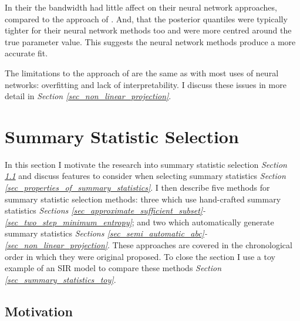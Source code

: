 \documentclass[11pt,a4paper]{article}
\theoremstyle{break}
\begin{document}
  \par In their the bandwidth had little affect on their neural network approaches, compared to the approach of \cite[]{ABC_in_population_genetics}. And, that the posterior quantiles were typically tighter for their neural network methods too and were more centred around the true parameter value. This suggests the neural network methods produce a more accurate fit.

  \par The limitations to the approach of \cite[]{non_linear_regression_models_for_abc} are the same as with most uses of neural networks: overfitting and lack of interpretability. I discuss these issues in more detail in \textit{Section \ref{sec_non_linear_projection}}.

\newpage
\section{Summary Statistic Selection}\label{sec_summary_stats}


  In this section I motivate the research into summary statistic selection \textit{Section \ref{sec_summary_stats_motivation}} and discuss features to consider when selecting summary statistics \textit{Section \ref{sec_properties_of_summary_statistics}}. I then describe five methods for summary statistic selection methods: three which use hand-crafted summary statistics \textit{Sections \ref{sec_approximate_sufficient_subset}-\ref{sec_two_step_minimum_entropy}}; and two which automatically generate summary statistics \textit{Sections \ref{sec_semi_automatic_abc}-\ref{sec_non_linear_projection}}. These approaches are covered in the chronological order in which they were original proposed. To close the section I use a toy example of an SIR model to compare these methods \textit{Section \ref{sec_summary_statistics_toy}}.

\subsection{Motivation}\label{sec_summary_stats_motivation}


\end{document}
